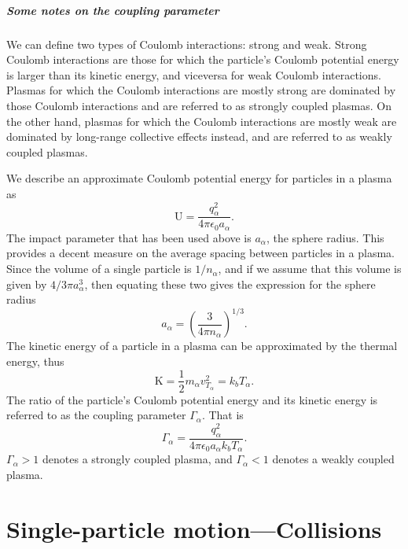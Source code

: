 \documentclass[oneside,a4paper,11pt]{report}
\begin{document}
\paragraph{Some notes on the coupling parameter}
We can define two types of Coulomb interactions: strong and weak. Strong Coulomb interactions are those for which the particle's Coulomb potential energy is larger than its kinetic energy, and viceversa for weak Coulomb interactions. Plasmas for which the Coulomb interactions are mostly strong are dominated by those Coulomb interactions and are referred to as strongly coupled plasmas. On the other hand, plasmas for which the Coulomb interactions are mostly weak are dominated by long-range collective effects instead, and are referred to as weakly coupled plasmas. 

We describe an approximate Coulomb potential energy for particles in a plasma as
\begin{equation}
    \text{U} =  \frac{q_\alpha^2}{4 \pi \epsilon_0 a_\alpha}.
\end{equation}
The impact parameter that has been used above is $a_\alpha$, the sphere radius. This provides a decent measure on the average spacing between particles in a plasma. Since the volume of a single particle is $1/n_\alpha$, and if we assume that this volume is given by $4/3 \pi a_\alpha^3$, then equating these two gives the expression for the sphere radius
\begin{equation}
    a_\alpha = \left ( \frac{3}{4 \pi n_\alpha} \right )^{1/3}.
\end{equation}
The kinetic energy of a particle in a plasma can be approximated by the thermal energy, thus
\begin{equation}
    \text{K} = \frac{1}{2} m_\alpha v_{T_\alpha}^2 = k_b T_\alpha.
\end{equation}
The ratio of the particle's Coulomb potential energy and its kinetic energy is referred to as the coupling parameter $\Gamma_\alpha$. That is 
\begin{equation}
    \Gamma_\alpha = \frac{q_\alpha^2}{4 \pi \epsilon_0 a_\alpha k_b T_\alpha}.
\end{equation}
$\Gamma_\alpha > 1$ denotes a strongly coupled plasma, and $\Gamma_\alpha < 1$ denotes a weakly coupled plasma. 

\chapter{Single-particle motion---Collisions}
\end{document}
